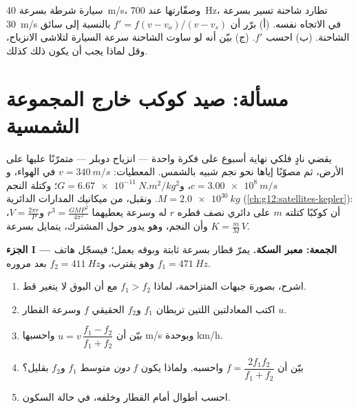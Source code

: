 \begin{exercise}[$\star\star\star$]\label{exo:g12:doppler-effect:15}
سيارة شرطة بسرعة \qty{40}{m/s}، وصفّارتها عند \qty{700}{Hz}، تطارد شاحنة تسير بسرعة \qty{30}{m/s}
في الاتجاه نفسه. (أ) برّر أن $f' = f(v - v_o)/(v - v_s)$ بالنسبة إلى سائق الشاحنة.
(ب) احسب $f'$. (ج) بيّن أنه لو ساوت الشاحنة سرعة السيارة لتلاشى الانزياح،
وقل لماذا يجب أن يكون ذلك كذلك.
\end{exercise}

\section{مسألة: صيد كوكب خارج المجموعة الشمسية}

\begin{problem}
\label{pb:g12:doppler-effect:1}
يقضي نادٍ فلكي نهاية أسبوع على فكرة واحدة --- انزياح دوبلر --- متمرّنًا عليها على الأرض،
ثم مصوّبًا إياها نحو نجم شبيه بالشمس. المعطيات: $v = \qty{340}{m/s}$  في الهواء،
و$c = \qty{3.00e8}{m/s}$، و$G = \qty{6.67e-11}{N.m^2/kg^2}$؛ وكتلة النجم
$M = \qty{2.0e30}{kg}$. ونقبل، من ميكانيك المدارات الدائرية
(\cref{ch:g12:satellites-kepler}): أن كوكبًا كتلته $m$ على  دائري نصف قطره $r$
له  وسرعة يعطيهما $r^3 = \frac{G M P^2}{4\pi^2}$ و$V = \frac{2\pi r}{P}$،
وأن النجم، وهو يدور حول  المشترك، يتمايل بسرعة $K = \frac{m}{M}\,V$.

\medskip
\noindent\textbf{الجزء I --- الجمعة: معبر السكة.}
يمرّ قطار بسرعة ثابتة وبوقه يعمل؛ فيسجّل هاتف $f_1 = \qty{471}{Hz}$ وهو
يقترب، و$f_2 = \qty{411}{Hz}$ بعد مروره.
\begin{enumerate}
  \item اشرح، بصورة جبهات  المتزاحمة، لماذا $f_1 > f_2$ مع أن البوق لا يتغير قط.
  \item اكتب المعادلتين اللتين تربطان $f_1$ و$f_2$  الحقيقي $f$ وسرعة القطار $u$.
  \item بيّن أن $u = v\,\dfrac{f_1 - f_2}{f_1 + f_2}$ واحسبها  \unit{m/s} وبوحدة \unit{km/h}.
  \item بيّن أن $f = \dfrac{2 f_1 f_2}{f_1 + f_2}$ واحسبه. ولماذا يكون $f$
        \emph{دون} متوسط $f_1$ و$f_2$ بقليل؟
  \item احسب أطوال  أمام القطار وخلفه،  في حالة السكون.
\end{enumerate}


\end{problem}
